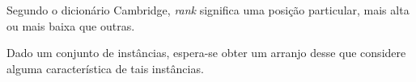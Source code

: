 Segundo o dicionário Cambridge, \emph{rank} significa uma posição particular,
mais alta ou mais baixa que outras.

Dado um conjunto de instâncias, espera-se obter um arranjo desse que considere
alguma característica de tais instâncias.


